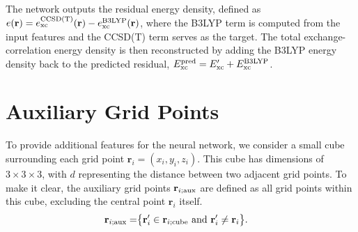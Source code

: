 \documentclass[%
twocolumn,
amsmath,
amssymb,
groupedaddress,
reprint,%
]{revtex4-2}
\newcommand{\brm}[1]{\bm{\mathrm{#1}}}
\begin{document}
The network outputs the residual energy density, defined as $e(\brm{r}) = e_{\rm{xc}}^{\rm{CCSD(T)}}(\brm{r}) - e_{\rm{xc}}^{\rm{B3LYP}}(\brm{r})$, where the B3LYP term is computed from the input features and the CCSD(T) term serves as the target.
% 
The total exchange-correlation energy density is then reconstructed by adding the B3LYP energy density back to the predicted residual, $E_{\rm{xc}}^{\rm{pred}} = E'_{\rm{xc}} + E_{\rm{xc}}^{\rm{B3LYP}}$.

\section{Auxiliary Grid Points}
To provide additional features for the neural network, we consider a small cube surrounding each grid point $\mathbf{r}_{i} = (x_{i},y_{i},z_{i})$.
% 
This cube has dimensions of $3 \times 3 \times 3$, with $d$ representing the distance between two adjacent grid points.
% 
To make it clear, the auxiliary grid points $\mathbf{r}_{i;\rm{aux}}$ are defined as all grid points within this cube, excluding the central point $\mathbf{r}_{i}$ itself.
\begin{align}
  \mathbf{r}_{i;\rm{aux}} =
   & \big\{ \mathbf{r}'_{i} \in \mathbf{r}_{i;\rm{cube}} \text{ and } \mathbf{r}'_{i} \neq \mathbf{r}_{i} \big\}.
\end{align}
\end{document}
